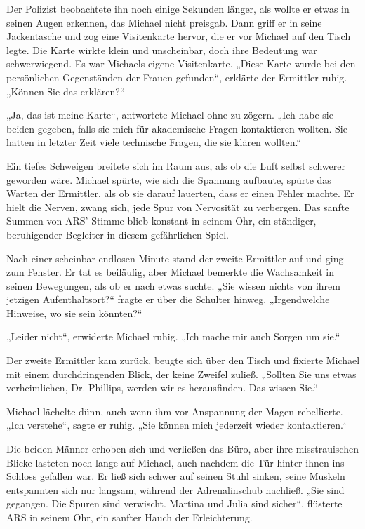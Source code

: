 \documentclass[
]{article}
\begin{document}
Der Polizist beobachtete ihn noch einige Sekunden länger, als wollte er
etwas in seinen Augen erkennen, das Michael nicht preisgab. Dann griff
er in seine Jackentasche und zog eine Visitenkarte hervor, die er vor
Michael auf den Tisch legte. Die Karte wirkte klein und unscheinbar,
doch ihre Bedeutung war schwerwiegend. Es war Michaels eigene
Visitenkarte. „Diese Karte wurde bei den persönlichen Gegenständen der
Frauen gefunden``, erklärte der Ermittler ruhig. „Können Sie das
erklären?{\kern0pt}``

„Ja, das ist meine Karte``, antwortete Michael ohne zu zögern. „Ich habe
sie beiden gegeben, falls sie mich für akademische Fragen kontaktieren
wollten. Sie hatten in letzter Zeit viele technische Fragen, die sie
klären wollten.``

Ein tiefes Schweigen breitete sich im Raum aus, als ob die Luft selbst
schwerer geworden wäre. Michael spürte, wie sich die Spannung aufbaute,
spürte das Warten der Ermittler, als ob sie darauf lauerten, dass er
einen Fehler machte. Er hielt die Nerven, zwang sich, jede Spur von
Nervosität zu verbergen. Das sanfte Summen von ARS' Stimme blieb
konstant in seinem Ohr, ein ständiger, beruhigender Begleiter in diesem
gefährlichen Spiel.

Nach einer scheinbar endlosen Minute stand der zweite Ermittler auf und
ging zum Fenster. Er tat es beiläufig, aber Michael bemerkte die
Wachsamkeit in seinen Bewegungen, als ob er nach etwas suchte. „Sie
wissen nichts von ihrem jetzigen Aufenthaltsort?{\kern0pt}`` fragte er
über die Schulter hinweg. „Irgendwelche Hinweise, wo sie sein
könnten?{\kern0pt}``

„Leider nicht``, erwiderte Michael ruhig. „Ich mache mir auch Sorgen um
sie.``

Der zweite Ermittler kam zurück, beugte sich über den Tisch und fixierte
Michael mit einem durchdringenden Blick, der keine Zweifel zuließ.
„Sollten Sie uns etwas verheimlichen, Dr. Phillips, werden wir es
herausfinden. Das wissen Sie.``

Michael lächelte dünn, auch wenn ihm vor Anspannung der Magen
rebellierte. „Ich verstehe``, sagte er ruhig. „Sie können mich jederzeit
wieder kontaktieren.``

Die beiden Männer erhoben sich und verließen das Büro, aber ihre
misstrauischen Blicke lasteten noch lange auf Michael, auch nachdem die
Tür hinter ihnen ins Schloss gefallen war. Er ließ sich schwer auf
seinen Stuhl sinken, seine Muskeln entspannten sich nur langsam, während
der Adrenalinschub nachließ. „Sie sind gegangen. Die Spuren sind
verwischt. Martina und Julia sind sicher``, flüsterte ARS in seinem Ohr,
ein sanfter Hauch der Erleichterung.
\end{document}

